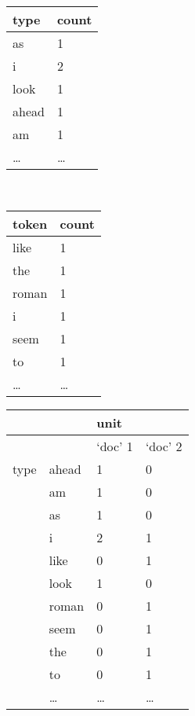 \documentclass{mediumfoils}
\begin{document}

\begin{center}
\small
\begin{tabular}{ll}\toprule
type & count\\ \midrule
as & 1\\
i & 2\\
look & 1\\
ahead & 1\\
am & 1\\
\ldots & \ldots\\ \bottomrule
\end{tabular}
~~~~~~~~~~
\begin{tabular}{ll}\toprule
token & count\\ \midrule
like & 1\\
the & 1\\
roman & 1\\
i & 1\\
seem & 1\\
to & 1\\
\ldots & \ldots\\ \bottomrule
\end{tabular}
\normalsize
\end{center}


\begin{center}
\small
\begin{tabular}{rlll}\toprule
          &         & unit    & \\ \midrule
          &         & `doc' 1 & `doc' 2 \\ \midrule
type      & ahead   & 1    & 0 \\
          & am      & 1    & 0 \\
          & as      & 1    & 0 \\
          & i       & 2    & 1 \\
          & like    & 0    & 1\\
          & look    & 1    & 0 \\
          & roman   & 0    & 1 \\
          & seem    & 0    & 1 \\          
          & the     & 0    & 1 \\
          & to      & 0    & 1\\
          & \ldots  & \ldots & \ldots \\ \bottomrule
\end{tabular}
\normalsize
\end{center}
\end{document}
